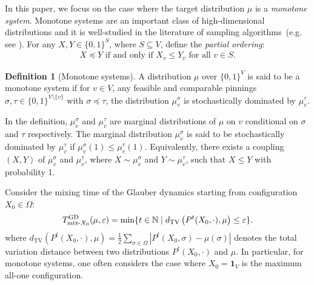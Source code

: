 \documentclass[11pt,a4paper]{article}
\newcommand{\DTV}[2]{d_{\mathrm{TV}}\left({#1},{#2}\right)}
\renewcommand{\epsilon}{\varepsilon}
\theoremstyle{definition}
\newtheorem{definition}[theorem]{Definition}
\def\*#1{\mathbf{#1}} %
\begin{document}
In this paper, we focus on the case where the target distribution $\mu$ is a \emph{monotone system}. 
Monotone systems are an important class of high-dimensional distributions and it is well-studied in the literature of sampling algorithms~(e.g. see \cite{JerrumS93,ProppW96,MS04,peres2013can,MS13,RSVVY14,GJ18,HSZ19}).
For any $X,Y \in \{0,1\}^S$, where $S \subseteq V$, define the \emph{partial ordering}:
\begin{align}\label{eq:order1}
    X \preceq Y \text{ if and only if } X_v\leq Y_v \text{ for all } v\in S.   
\end{align}

\begin{definition}[Monotone systems]\label{def:monotone-system}
    A distribution $\mu$ over $\{0,1\}^V$ is said to be a monotone system if for $v \in V$, any feasible and comparable pinnings $\sigma,\tau \in \{0,1\}^{V \setminus \{v\}}$ with $\sigma \preceq \tau$, the distribution $\mu^\sigma_v$ is stochastically dominated by $\mu^\tau_v$.
\end{definition}
In the definition, $\mu^\sigma_v$ and $\mu^\tau_v$ are marginal distributions of $\mu$ on $v$ conditional on $\sigma$ and $\tau$ respectively.
The marginal distribution $\mu^\sigma_v$ is said to be stochastically dominated by $\mu^\tau_v$ if $\mu^\sigma_v(1) \leq \mu^\tau_v(1)$. Equivalently, there exists a coupling $(X,Y)$ of $\mu^\sigma_v$ and $\mu^\tau_v$, where $X \sim \mu^\sigma_v$ and $Y \sim \mu^\tau_v$, such that $X \leq Y$ with probability 1.

Consider the mixing time of the Glauber dynamics starting from configuration $X_0 \in \Omega$:
\begin{align}\label{eq:mix-init}
    T^{\textnormal{GD}}_{\textnormal{mix-}X_0}(\mu,\epsilon) = \min\{t \in \mathbb{N} \mid \DTV{P^t(X_0,\cdot)}{\mu}\leq \epsilon\}.
\end{align}    
where $\DTV{P^t(X_0,\cdot)}{\mu} = \frac{1}{2} \sum_{\sigma \in \Omega} |P^t(X_0,\sigma) - \mu(\sigma)|$ denotes the total variation distance between two distributions $P^t(X_0,\cdot)$ and $\mu$.
In particular, for monotone systems, one often considers the case where $X_0 = \*1_V$ is the maximum all-one configuration.%
\end{document}
